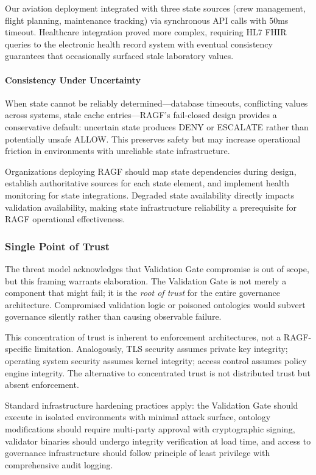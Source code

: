 \documentclass[sigconf,nonacm]{acmart}
\begin{document}
Our aviation deployment integrated with three state sources (crew management, flight planning, maintenance tracking) via synchronous API calls with 50ms timeout. Healthcare integration proved more complex, requiring HL7 FHIR queries to the electronic health record system with eventual consistency guarantees that occasionally surfaced stale laboratory values.

\paragraph{Consistency Under Uncertainty} When state cannot be reliably determined---database timeouts, conflicting values across systems, stale cache entries---RAGF's fail-closed design provides a conservative default: uncertain state produces DENY or ESCALATE rather than potentially unsafe ALLOW. This preserves safety but may increase operational friction in environments with unreliable state infrastructure.

Organizations deploying RAGF should map state dependencies during design, establish authoritative sources for each state element, and implement health monitoring for state integrations. Degraded state availability directly impacts validation availability, making state infrastructure reliability a prerequisite for RAGF operational effectiveness.

\subsubsection{Single Point of Trust}

The threat model acknowledges that Validation Gate compromise is out of scope, but this framing warrants elaboration. The Validation Gate is not merely a component that might fail; it is the \emph{root of trust} for the entire governance architecture. Compromised validation logic or poisoned ontologies would subvert governance silently rather than causing observable failure.

This concentration of trust is inherent to enforcement architectures, not a RAGF-specific limitation. Analogously, TLS security assumes private key integrity; operating system security assumes kernel integrity; access control assumes policy engine integrity. The alternative to concentrated trust is not distributed trust but absent enforcement.

Standard infrastructure hardening practices apply: the Validation Gate should execute in isolated environments with minimal attack surface, ontology modifications should require multi-party approval with cryptographic signing, validator binaries should undergo integrity verification at load time, and access to governance infrastructure should follow principle of least privilege with comprehensive audit logging.
\end{document}
